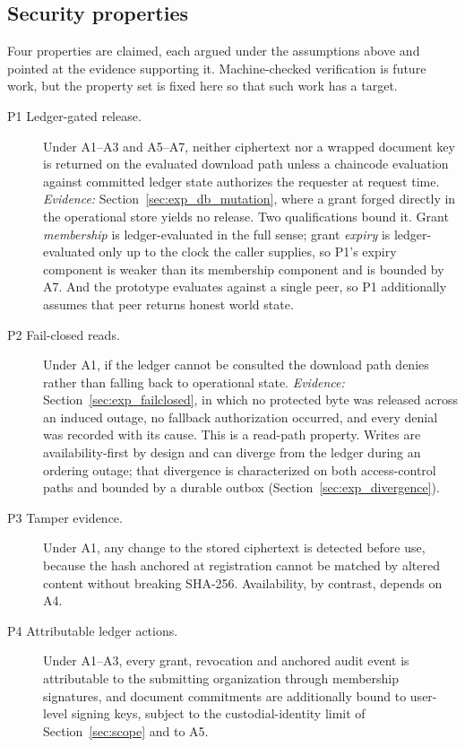 \documentclass[preprint,12pt]{elsarticle}
\begin{document}
\subsection{Security properties}
\label{sec:security_properties}

Four properties are claimed, each argued under the assumptions above and pointed
at the evidence supporting it. Machine-checked verification is future work, but
the property set is fixed here so that such work has a target.

\begin{description}
\item[P1 Ledger-gated release.] Under A1--A3 and A5--A7, neither ciphertext nor
a wrapped document key is returned on the evaluated download path unless a
chaincode evaluation against committed ledger state authorizes the requester at
request time. \emph{Evidence:} Section~\ref{sec:exp_db_mutation}, where a grant
forged directly in the operational store yields no release. Two qualifications
bound it. Grant \emph{membership} is ledger-evaluated in the full sense; grant
\emph{expiry} is ledger-evaluated only up to the clock the caller supplies, so
P1's expiry component is weaker than its membership component and is bounded by
A7. And the prototype evaluates against a single peer, so P1 additionally
assumes that peer returns honest world state.

\item[P2 Fail-closed reads.] Under A1, if the ledger cannot be consulted the
download path denies rather than falling back to operational state.
\emph{Evidence:} Section~\ref{sec:exp_failclosed}, in which no protected
byte was released across an induced outage, no fallback authorization occurred,
and every denial was recorded with its cause. This is a read-path property. Writes are availability-first by
design and can diverge from the ledger during an ordering outage; that divergence
is characterized on both access-control paths and bounded by a durable outbox
(Section~\ref{sec:exp_divergence}).

\item[P3 Tamper evidence.] Under A1, any change to the stored ciphertext is
detected before use, because the hash anchored at registration cannot be
matched by altered content without breaking SHA-256. Availability, by contrast,
depends on A4.

\item[P4 Attributable ledger actions.] Under A1--A3, every grant, revocation and
anchored audit event is attributable to the submitting organization through
membership signatures, and document commitments are additionally bound to
user-level signing keys, subject to the custodial-identity limit of
Section~\ref{sec:scope} and to A5.
\end{description}
\end{document}
